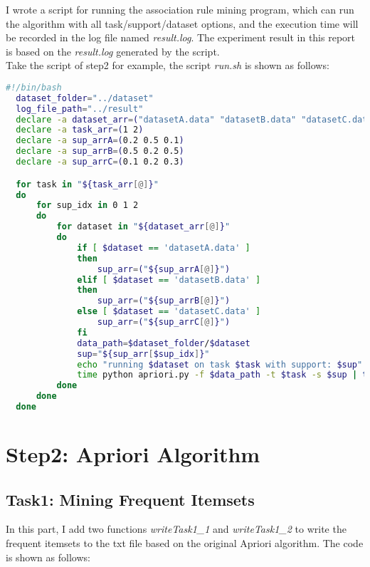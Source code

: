 \documentclass[a4paper, oneside, final, 12pt]{scrartcl} %
\begin{document}
I wrote a script for running the association rule mining program,
which can run the algorithm with all task/support/dataset options,
and the execution time will be recorded in the log file named \emph{result.log}.
The experiment result in this report is 
based on the \emph{result.log} generated by the script. \\
Take the script of step2 for example, the script 
\emph{run.sh} is shown as follows:

\begin{lstlisting}[language=bash]
  #!/bin/bash
  dataset_folder="../dataset"
  log_file_path="../result"
  declare -a dataset_arr=("datasetA.data" "datasetB.data" "datasetC.data")
  declare -a task_arr=(1 2)
  declare -a sup_arrA=(0.2 0.5 0.1)
  declare -a sup_arrB=(0.5 0.2 0.5)
  declare -a sup_arrC=(0.1 0.2 0.3)

  for task in "${task_arr[@]}"
  do
      for sup_idx in 0 1 2
      do
          for dataset in "${dataset_arr[@]}"
          do
              if [ $dataset == 'datasetA.data' ]
              then
                  sup_arr=("${sup_arrA[@]}")
              elif [ $dataset == 'datasetB.data' ]
              then
                  sup_arr=("${sup_arrB[@]}")
              else [ $dataset == 'datasetC.data' ]
                  sup_arr=("${sup_arrC[@]}")
              fi
              data_path=$dataset_folder/$dataset
              sup="${sup_arr[$sup_idx]}"
              echo "running $dataset on task $task with support: $sup"
              time python apriori.py -f $data_path -t $task -s $sup | tee -a $log_file_path/result.log
          done
      done
  done
\end{lstlisting}

\endgroup

\section{Step2: Apriori Algorithm}

\subsection{Task1: Mining Frequent Itemsets}

\begingroup
\raggedright
In this part, I add two functions \emph{writeTask1\_1} and \emph{writeTask1\_2} to
write the frequent itemsets to the txt file based on the original Apriori algorithm. 
The code is shown as follows:
\end{document}
